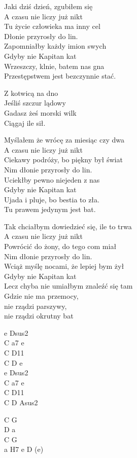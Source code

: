 \begin{text}
    Jaki dziś dzień, zgubiłem się\\
    A czasu nie liczy już nikt\\
    Tu życie człowieka ma inny cel\\
    Dłonie przyrosły do lin.\\
    Zapomniałby każdy imion swych\\
    Gdyby nie Kapitan kat\\
    Wrzeszczy, klnie, batem nas gna\\
    Przestępstwem jest bezczynnie stać.

    Z kotwicą na dno\\
    Jeśliś szczur lądowy\\
    Gadasz żeś morski wilk\\
    Ciągaj ile sił.

    Myślałem że wrócę za miesiąc czy dwa\\
    A czasu nie liczy już nikt\\
    Ciekawy podróży, bo piękny był świat\\
    Nim dłonie przyrosły do lin.\\
    Uciekłby pewno niejeden z nas\\
    Gdyby nie Kapitan kat\\
    Ujada i pluje, bo bestia to zła.\\
    Tu prawem jedynym jest bat.

    Tak chciałbym dowiedzieć się, ile to trwa\\
    A czasu nie liczy już nikt\\
    Powrócić do żony, do tego com miał\\
    Nim dłonie przyrosły do lin.\\
    Wciąż myślę nocami, że lepiej bym żył\\
    Gdyby nie Kapitan kat\\
    Lecz chyba nie umiałbym znaleźć się tam\\
    Gdzie nie ma przemocy,\\
    nie rządzi parszywy,\\
    nie rządzi okrutny bat
\end{text}
\begin{chord}
    e Dsus2\\
    C a7 e\\
    C D11\\
    C D e\\
    e Dsus2\\
    C a7 e\\
    C D11\\
    C D Asus2

    C G\\
    D a\\
    C G\\
    a H7 e D (e)
\end{chord}